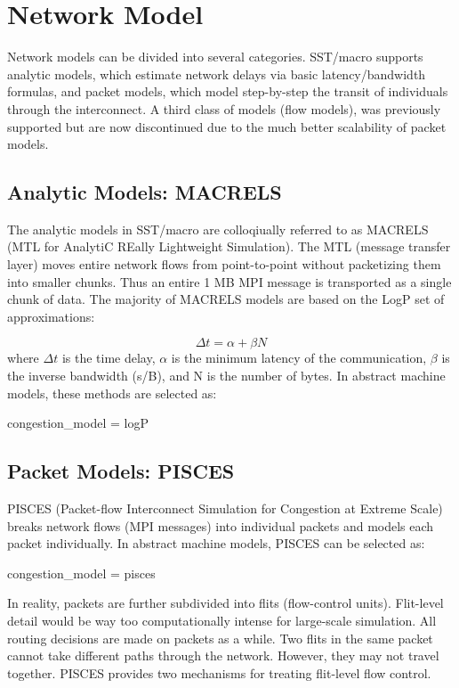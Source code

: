 
\section{Network Model}
\label{sec:tutorial:networkmodel}

Network models can be divided into several categories.  SST/macro supports analytic models, which estimate network delays via basic latency/bandwidth formulas, and packet models, which model step-by-step the transit of individuals through the interconnect.
A third class of models (flow models), was previously supported but are now discontinued due to the much better scalability of packet models.

\subsection{Analytic Models: MACRELS}
\label{subsec:tutorial:macrels}

The analytic models in SST/macro are colloqiually referred to as MACRELS (MTL for AnalytiC REally Lightweight Simulation).
The MTL (message transfer layer) moves entire network flows from point-to-point without packetizing them into smaller chunks.
Thus an entire 1 MB MPI message is transported as a single chunk of data.  
The majority of MACRELS models are based on the LogP set of approximations:

\begin{equation}
\Delta t = \alpha + \beta N
\end{equation}
where $\Delta t$ is the time delay, $\alpha$ is the minimum latency of the communication, $\beta$ is the inverse bandwidth (s/B), and N is the number of bytes.
In abstract machine models, these methods are selected as:

\begin{ViFile}
congestion_model = logP
\end{ViFile}

\subsection{Packet Models: PISCES}
\label{subsec:tutorial:pisces}

PISCES (Packet-flow Interconnect Simulation for Congestion at Extreme Scale) breaks network flows (MPI messages) into individual packets and models each packet individually.
In abstract machine models, PISCES can be selected as:

\begin{ViFile}
congestion_model = pisces
\end{ViFile}
In reality, packets are further subdivided into flits (flow-control units).
Flit-level detail would be way too computationally intense for large-scale simulation.
All routing decisions are made on packets as a while. 
Two flits in the same packet cannot take different paths through the network.
However, they may not travel together.
PISCES provides two mechanisms for treating flit-level flow control.

